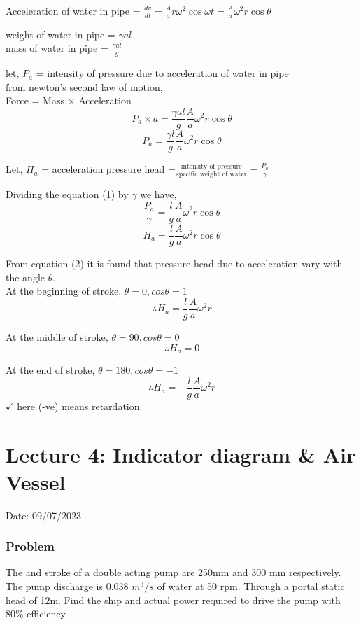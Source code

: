 \documentclass{article}
\begin{document}
  Acceleration of water in pipe = $\frac{dv}{dt} = \frac{A}{a} r \omega^2 \cos \omega t = \frac{A}{a} \omega^2 r \cos \theta$ 

  weight of water in pipe = $\gamma a l$ \\ 
  mass of water in pipe = $\frac{\gamma a l}{g}$

  let, $P_a$ = intensity of pressure due to acceleration of water in pipe \\
  from newton's second law of motion,\\
  Force = Mass $\times$ Acceleration \\
  $$P_a \times a = \frac{\gamma a l}{g} \frac{A}{a} \omega^2 r \cos \theta$$
  \begin{equation}
    P_a = \frac{\gamma l}{g} \frac{A}{a} \omega^2 r \cos \theta \label{eq:eq1}
  \end{equation}

  Let, $H_a$ = acceleration pressure head 
  =$\frac{\text{intensity of pressure}}{\text{specific weight of water}} = \frac{P_a}{\gamma}$

  Dividing the equation (1) by $\gamma$ we have,
  $$\frac{P_a}{\gamma} = \frac{l}{g} \frac{A}{a} \omega^2 r \cos \theta$$
  \begin{equation}
    H_a = \frac{l}{g} \frac{A}{a} \omega^2 r \cos \theta \label{eq:eq2}
  \end{equation}

  From equation (2) it is found that pressure head due to acceleration vary with the angle $\theta$. \\
  At the beginning of stroke, $\theta = 0, cos\theta = 1$ \\
  $$\therefore H_a = \frac{l}{g} \frac{A}{a} \omega^2 r$$ 

  At the middle of stroke, $\theta = 90, cos\theta = 0$ \\
  $$\therefore H_a = 0$$ 

  At the end of stroke, $\theta = 180, cos\theta = -1$ \\
  $$\therefore H_a = - \frac{l}{g} \frac{A}{a} \omega^2 r$$ 
  $\checkmark$ here (-ve) means retardation.

  \hrulefill 

  \section{Lecture 4: Indicator diagram \& Air Vessel}
\hfill Date: 09/07/2023

\subsubsection*{Problem}
The and stroke of a double acting pump are 250mm and 300 mm respectively. The pump discharge is 0.038 $m^3/s$ of water at 50 rpm. Through a portal static head of 12m. Find the ship and actual power required to drive the pump with 80\% efficiency. 
\end{document}
